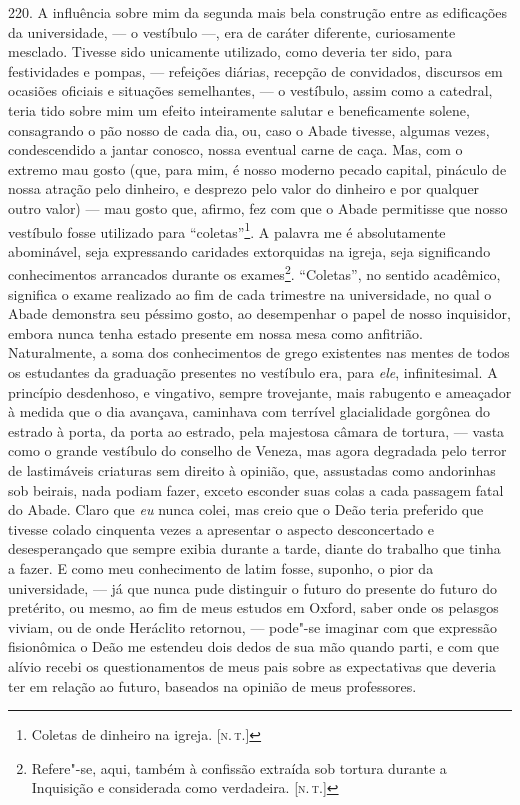 220. A influência sobre mim da segunda mais bela construção entre as
edificações da universidade, --- o vestíbulo ---, era de caráter
diferente, curiosamente mesclado. Tivesse sido unicamente utilizado,
como deveria ter sido, para festividades e pompas, --- refeições diárias,
recepção de convidados, discursos em ocasiões oficiais e situações
semelhantes, --- o vestíbulo, assim como a catedral, teria tido sobre mim
um efeito inteiramente salutar e beneficamente solene, consagrando o pão
nosso de cada dia, ou, caso o Abade tivesse, algumas vezes,
condescendido a jantar conosco, nossa eventual carne de caça. Mas, com o
extremo mau gosto (que, para mim, é nosso moderno pecado capital,
pináculo de nossa atração pelo dinheiro, e desprezo pelo valor do
dinheiro e por qualquer outro valor) --- mau gosto que, afirmo, fez com
que o Abade permitisse que nosso vestíbulo fosse utilizado para
``coletas''\footnote{Coletas de dinheiro na igreja. {[}\textsc{n.\,t.}{]}}. A
palavra me é absolutamente abominável, seja expressando caridades
extorquidas na igreja, seja significando conhecimentos arrancados
durante os exames\footnote{Refere"-se, aqui, também à confissão extraída
  sob tortura durante a Inquisição e considerada como verdadeira. {[}\textsc{n.\,t.}{]}}. ``Coletas'', no sentido acadêmico, significa o exame
realizado ao fim de cada trimestre na universidade, no qual o Abade
demonstra seu péssimo gosto, ao desempenhar o papel de nosso inquisidor,
embora nunca tenha estado presente em nossa mesa como anfitrião.
Naturalmente, a soma dos conhecimentos de grego existentes nas mentes de
todos os estudantes da graduação presentes no vestíbulo era, para
\emph{ele}, infinitesimal. A princípio desdenhoso, e vingativo, sempre
trovejante, mais rabugento e ameaçador à medida que o dia avançava,
caminhava com terrível glacialidade gorgônea do estrado à porta, da
porta ao estrado, pela majestosa câmara de tortura, --- vasta como o
grande vestíbulo do conselho de Veneza, mas agora degradada pelo terror
de lastimáveis criaturas sem direito à opinião, que, assustadas como
andorinhas sob beirais, nada podiam fazer, exceto esconder suas colas a
cada passagem fatal do Abade. Claro que \emph{eu} nunca colei, mas creio
que o Deão teria preferido que tivesse colado cinquenta vezes a
apresentar o aspecto desconcertado e desesperançado que sempre exibia
durante a tarde, diante do trabalho que tinha a fazer. E como meu
conhecimento de latim fosse, suponho, o pior da universidade, --- já que
nunca pude distinguir o futuro do presente do futuro do pretérito, ou
mesmo, ao fim de meus estudos em Oxford, saber onde os pelasgos viviam,
ou de onde Heráclito retornou, --- pode"-se imaginar com que expressão
fisionômica o Deão me estendeu dois dedos de sua mão quando parti, e com
que alívio recebi os questionamentos de meus pais sobre as expectativas
que deveria ter em relação ao futuro, baseados na opinião de meus
professores.

